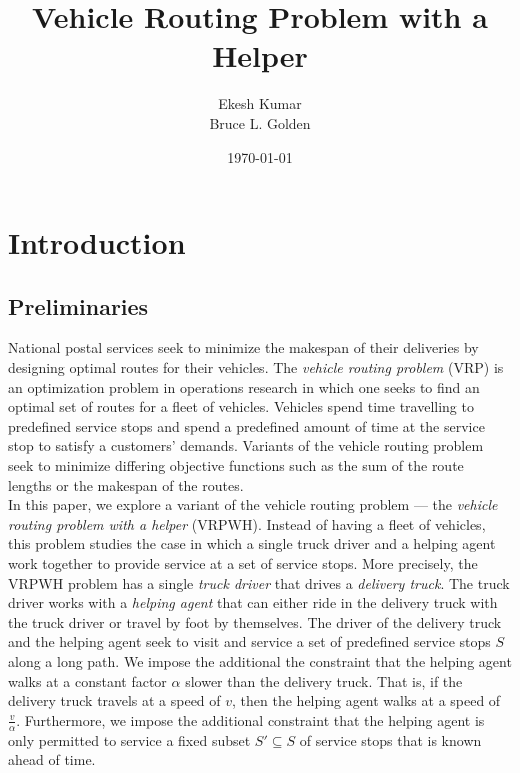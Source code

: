 \documentclass[12pt]{scrartcl}
\begin{document}
\doublespacing

\title{Vehicle Routing Problem with a Helper}
\author{Ekesh Kumar \\ Bruce L. Golden}
\date{\today}

\maketitle
\tableofcontents
\newpage


\section{Introduction}
\subsection{Preliminaries}
National postal services seek to minimize the makespan of their deliveries by designing optimal routes for their vehicles. The \textit{vehicle routing problem} (VRP) is an optimization problem in operations research in which one seeks to find an optimal set of routes for a fleet of vehicles. Vehicles spend time travelling to predefined service stops and spend a predefined amount of time at the service stop to satisfy a customers' demands. Variants of the vehicle routing problem seek to minimize differing objective functions such as the sum of the route lengths or the makespan of the routes. \\

In this paper, we explore a variant of the vehicle routing problem --- the \textit{vehicle routing problem with a helper} (VRPWH). Instead of having a fleet of vehicles, this problem studies the case in which a single truck driver and a helping agent work together to provide service at a set of service stops. More precisely, the VRPWH problem has a single \textit{truck driver} that drives a \textit{delivery truck}. The truck driver works with a \textit{helping agent} that can either ride in the delivery truck with the truck driver or travel by foot by themselves. The driver of the delivery truck and the helping agent seek to visit and service a set of predefined service stops $S$ along a long path. We impose the additional the constraint that the helping agent walks at a constant factor $\alpha$ slower than the delivery truck. That is, if the delivery truck travels at a speed of $v$, then the helping agent walks at a speed of $\frac{v}{\alpha}$. Furthermore, we impose the additional constraint that the helping agent is only permitted to service a fixed subset $S' \subseteq S$ of service stops that is known ahead of time. \\ %
\end{document}
